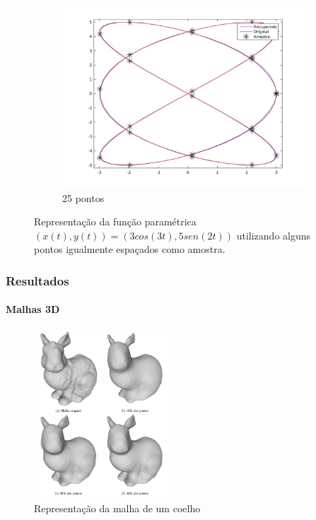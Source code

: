 \begin{frame}
\begin{figure}
\begin{subfigure}[b]{0.31\textwidth}
	\end{subfigure}
	\hfill
	\begin{subfigure}[b]{0.31\textwidth}
		\centering
		\includegraphics[trim={5cm 2cm 3cm 2cm},clip,width=\textwidth]{img/rep_2_25.jpg}
		\caption{25 pontos}
		\label{fig:ex23}
	\end{subfigure} %
	\caption{Representação da função paramétrica $(x(t), y(t)) = (3 cos(3t), 5sen(2t))$ utilizando alguns pontos igualmente espaçados como amostra.}
	\label{fig:ex2rep}
\end{figure}

\end{frame}


\begin{frame}
\frametitle{Resultados}
\framesubtitle{Malhas 3D}

\begin{figure}[hbt]
\begin{center}
	\caption{Representação da malha de um coelho}
	\includegraphics[width=0.45\textwidth]{img/mesh.png}
\end{center}
\end{figure}

\end{frame}


